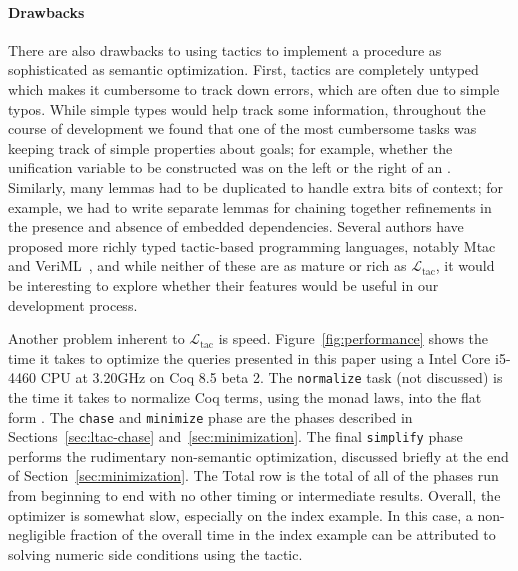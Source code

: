 \documentclass[preprint]{sigplanconf}
\newcommand{\ltac}[0]{\ensuremath{\mathcal{L}_{\mathrm{tac}}}}
\begin{document}
\paragraph{Drawbacks}
There are also drawbacks to using tactics to implement a procedure as sophisticated as semantic optimization.
First, tactics are completely untyped which makes it cumbersome to track down errors, which are often due to simple typos.
While simple types would help track some information, throughout the course of development we found that one of the most cumbersome tasks was keeping track of simple properties about goals; for example, whether the unification variable to be constructed was on the left or the right of an .
Similarly, many lemmas had to be duplicated to handle extra bits of context; for example, we had to write separate lemmas for chaining together refinements in the presence and absence of embedded dependencies.
Several authors have proposed more richly typed tactic-based programming languages, notably Mtac~\cite{ziliani2013mtac} and VeriML~\cite{stampoulis2010veriml}, and while neither of these are as mature or rich as \ltac, it would be interesting to explore whether their features would be useful in our development process.

Another problem inherent to \ltac{} is speed.
Figure~\ref{fig:performance} shows the time it takes to optimize the queries presented in this paper using a Intel Core i5-4460  CPU at 3.20GHz on Coq 8.5 beta 2.  The {\tt normalize} task (not discussed) is the time it takes to normalize Coq terms, using the monad laws, into the flat form .
The {\tt chase} and {\tt minimize} phase are the phases described in Sections~\ref{sec:ltac-chase} and~\ref{sec:minimization}.
The final {\tt simplify} phase performs the rudimentary non-semantic optimization, discussed briefly at the end of Section~\ref{sec:minimization}.
The Total row is the total of all of the phases run from beginning to end with no other timing or intermediate results.
Overall, the optimizer is somewhat slow, especially on the index example.
In this case, a non-negligible fraction of the overall time in the index example can be attributed to solving numeric side conditions using the  tactic.
\end{document}

